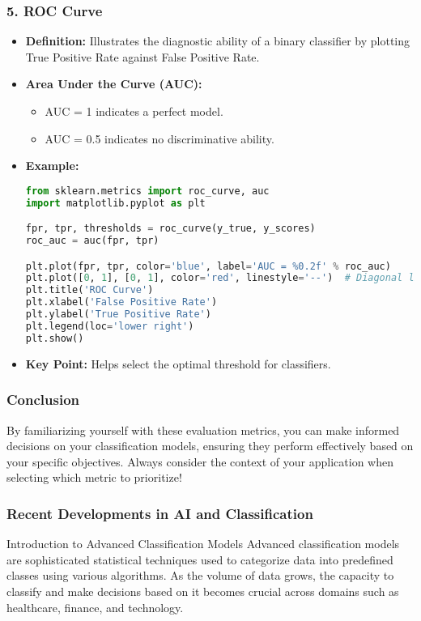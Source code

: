 \documentclass[aspectratio=169]{beamer}
\begin{document}
\begin{frame}[fragile]
    \frametitle{5. ROC Curve}
    \begin{itemize}
        \item \textbf{Definition:} Illustrates the diagnostic ability of a binary classifier by plotting True Positive Rate against False Positive Rate.
        \item \textbf{Area Under the Curve (AUC):} 
        \begin{itemize}
            \item AUC = 1 indicates a perfect model.
            \item AUC = 0.5 indicates no discriminative ability.
        \end{itemize}
        \item \textbf{Example:}
        \begin{lstlisting}[language=Python]
from sklearn.metrics import roc_curve, auc
import matplotlib.pyplot as plt

fpr, tpr, thresholds = roc_curve(y_true, y_scores)
roc_auc = auc(fpr, tpr)

plt.plot(fpr, tpr, color='blue', label='AUC = %0.2f' % roc_auc)
plt.plot([0, 1], [0, 1], color='red', linestyle='--')  # Diagonal line
plt.title('ROC Curve')
plt.xlabel('False Positive Rate')
plt.ylabel('True Positive Rate')
plt.legend(loc='lower right')
plt.show()
        \end{lstlisting}
        \item \textbf{Key Point:} Helps select the optimal threshold for classifiers.
    \end{itemize}
\end{frame}

\begin{frame}[fragile]
    \frametitle{Conclusion}
    By familiarizing yourself with these evaluation metrics, you can make informed decisions on your classification models, ensuring they perform effectively based on your specific objectives. Always consider the context of your application when selecting which metric to prioritize!
\end{frame}

\begin{frame}
    \frametitle{Recent Developments in AI and Classification}
    \begin{block}{Introduction to Advanced Classification Models}
        Advanced classification models are sophisticated statistical techniques used to categorize data into predefined classes using various algorithms. 
        As the volume of data grows, the capacity to classify and make decisions based on it becomes crucial across domains such as healthcare, finance, and technology.
    \end{block}
\end{frame}
\end{document}
